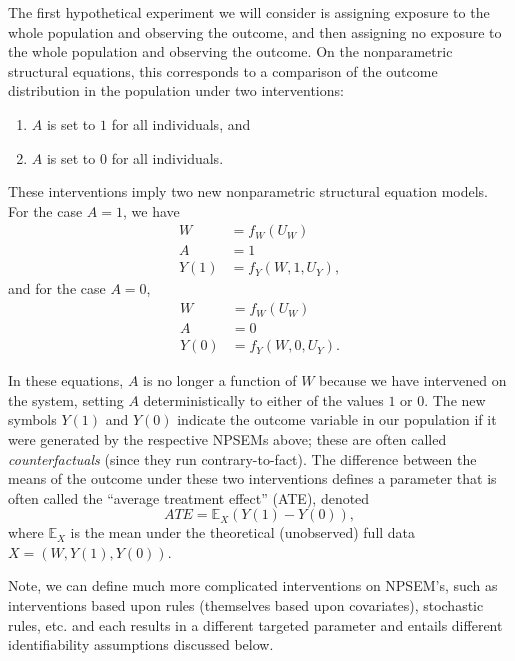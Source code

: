 \documentclass[12pt, krantz2,]{book}
\providecommand{\tightlist}{%
  \setlength{\itemsep}{0pt}\setlength{\parskip}{0pt}}
\theoremstyle{definition}
\theoremstyle{definition}
\theoremstyle{definition}
\newcommand{\1}{\mathbbm{1}}
\begin{document}
The first hypothetical experiment we will consider is assigning exposure to the
whole population and observing the outcome, and then assigning no exposure to
the whole population and observing the outcome. On the nonparametric structural
equations, this corresponds to a comparison of the outcome distribution in the
population under two interventions:

\begin{enumerate}
\def\labelenumi{\arabic{enumi}.}
\tightlist
\item
  \(A\) is set to \(1\) for all individuals, and
\item
  \(A\) is set to \(0\) for all individuals.
\end{enumerate}

These interventions imply two new nonparametric structural equation models. For
the case \(A = 1\), we have
\begin{align*}
  W &= f_W(U_W) \\
  A &= 1 \\
  Y(1) &= f_Y(W, 1, U_Y),
\end{align*}
and for the case \(A=0\),
\begin{align*}
  W &= f_W(U_W) \\
  A &= 0 \\
  Y(0) &= f_Y(W, 0, U_Y).
\end{align*}

In these equations, \(A\) is no longer a function of \(W\) because we have
intervened on the system, setting \(A\) deterministically to either of the values
\(1\) or \(0\). The new symbols \(Y(1)\) and \(Y(0)\) indicate the outcome variable in
our population if it were generated by the respective NPSEMs above; these are
often called \emph{counterfactuals} (since they run contrary-to-fact). The difference
between the means of the outcome under these two interventions defines a
parameter that is often called the ``average treatment effect'' (ATE), denoted
\begin{equation}
  ATE = \mathbb{E}_X(Y(1)-Y(0)),
  \label{eq:ate}
\end{equation}
where \(\mathbb{E}_X\) is the mean under the theoretical (unobserved) full data
\(X = (W, Y(1), Y(0))\).

Note, we can define much more complicated interventions on NPSEM's, such as
interventions based upon rules (themselves based upon covariates), stochastic
rules, etc. and each results in a different targeted parameter and entails
different identifiability assumptions discussed below.
\end{document}

